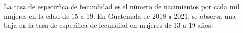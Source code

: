 La tasa de especirfica de fecundidad es el número de nacimientos por cada mil mujeres en la edad de 15 a 19. En Guatemala de 2018 a 2021, se observa una baja en la tasa de específica de fecundiad en mujeres de 13 a 19 años.